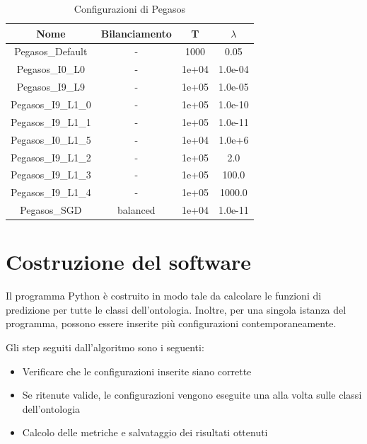 \documentclass[12pt,a4paper,oneside,hidelinks]{report}
\begin{document}
\begin{table}[ht]%
\centering
\caption{Configurazioni di Pegasos}\label{tab:b3}
\begin{tabular}{|c|c|S[table-parse-only = true]|S[table-parse-only = true]|}
\hline
Nome                 & Bilanciamento &  T       & $\lambda$ \\
\hline 
Pegasos\_Default     & -             & 1000     & 0.05      \\
\hline 
Pegasos\_I0\_L0      & -             & 1e+04    & 1.0e-04   \\
\hline 
Pegasos\_I9\_L9      & -             & 1e+05    & 1.0e-05   \\
\hline 
Pegasos\_I9\_L1\_0   & -             & 1e+05    & 1.0e-10   \\
\hline 
Pegasos\_I9\_L1\_1   & -             & 1e+05    & 1.0e-11   \\
\hline 
Pegasos\_I0\_L1\_5   & -             & 1e+04    & 1.0e+6    \\
\hline 
Pegasos\_I9\_L1\_2   & -             & 1e+05    & 2.0       \\
\hline 
Pegasos\_I9\_L1\_3   & -             & 1e+05    & 100.0     \\
\hline 
Pegasos\_I9\_L1\_4   & -             & 1e+05    & 1000.0    \\
\hline 
Pegasos\_SGD         & balanced      & 1e+04    & 1.0e-11   \\
\hline 
\end{tabular} 
\end{table}

\newpage

\section{Costruzione del software}
Il programma Python è costruito in modo tale da calcolare le funzioni di predizione per tutte le classi dell'ontologia. Inoltre, per una singola istanza del programma, possono essere inserite più configurazioni contemporaneamente.

Gli step seguiti dall'algoritmo sono i seguenti:

\begin{itemize}
    \item Verificare che le configurazioni inserite siano corrette
    \item Se ritenute valide, le configurazioni vengono eseguite una alla volta sulle classi dell'ontologia
    \item Calcolo delle metriche e salvataggio dei risultati ottenuti
\end{itemize}
\end{document}
